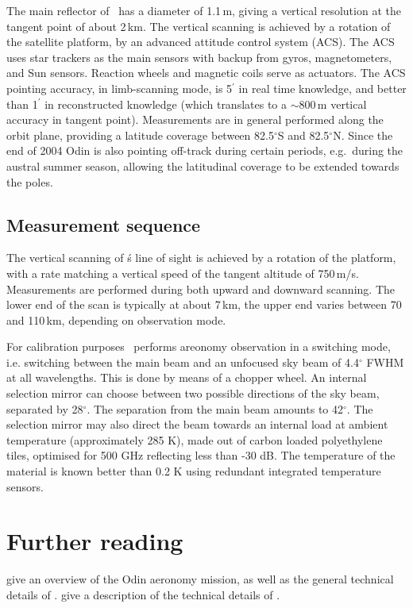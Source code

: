 The main reflector of \smr\ has a diameter of 1.1\,m, giving a
vertical resolution at the tangent point of about 2\,km. 
The vertical scanning is achieved by a rotation of the satellite
platform, by an advanced attitude control system (ACS). 
The ACS uses star trackers as the main sensors with backup from gyros, 
magnetometers, and Sun sensors. Reaction wheels and magnetic coils serve as 
actuators. The ACS pointing accuracy, in limb-scanning mode, is 5\(^{'}\) in
real time knowledge, and better than 1\(^{'}\) in reconstructed knowledge
(which translates to a \(\sim\)800\,m vertical accuracy in tangent point).
Measurements are in general performed along the orbit plane, providing a
latitude coverage between 82.5$^{\circ}$S and 82.5$^{\circ}$N. Since the end of
2004 Odin is also pointing off-track during certain periods, e.g.\ during the
austral summer season, allowing the latitudinal coverage to be extended towards
the poles. 




\subsection{Measurement sequence}


The vertical scanning of \smr\'s line of sight is achieved by a
rotation of the platform, with a rate matching a vertical speed of
the tangent altitude of 750\,m/s. Measurements are performed during
both upward and downward scanning. The lower end of the scan is typically
at about 7\,km, the upper end varies between 70 and 110\,km, depending on
observation mode.

For calibration purposes \smr\ performs areonomy observation
in a switching mode, i.e. switching between the main beam and
an unfocused sky beam of 4.4$^{\circ}$ FWHM at all wavelengths. This is done
by means of a chopper wheel. An internal selection mirror
can choose between two possible directions of the sky beam,
separated by 28$^{\circ}$. The separation from the main beam
amounts to 42$^{\circ}$.
The selection mirror may also direct the beam towards an internal
load at ambient temperature (approximately 285 K), made out of carbon 
loaded polyethylene  tiles, optimised for 500 GHz reflecting less than -30 dB. 
The temperature of the material is known better than 0.2 K using 
redundant integrated temperature sensors.



\section{Further reading}
\label{sec:reading}

\citet{murtagh:anove:02} give an overview of the Odin aeronomy mission, as well
as the general technical details of \smr. \citet{frisk:theod:03} give a description
of the technical details of \smr.


